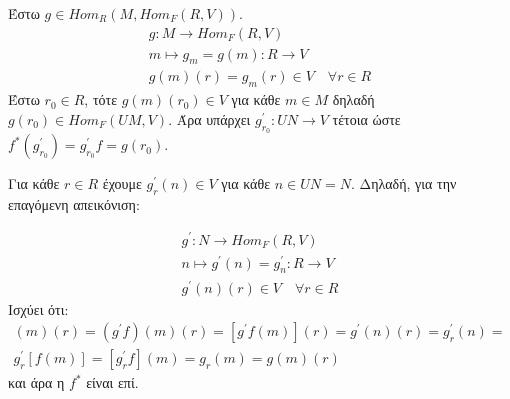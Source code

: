 \documentclass{article}
\begin{document}
\begin{enumerate}
	Έστω $g \in Hom_R (M, Hom_F (R,V))$.
	\begin{gather*}
		g: M \rightarrow Hom_F (R,V)\\
		m \mapsto g_m = g(m) : R \rightarrow V \\
		g(m)(r) = g_m (r) \in V \quad\forall r \in R
	\end{gather*}
	Έστω $r_0 \in R$, τότε $g(m)(r_0) \in V$ για κάθε $m \in M$ δηλαδή $g(r_0 ) \in Hom_F(UM, V)$. Άρα υπάρχει $g^{\prime}_{r_0} : UN \rightarrow V$ τέτοια ώστε $f^* (g^{\prime}_{r_0} ) = g^{\prime}_{r_0}f = g(r_0)$.

	Για κάθε $r \in R$ έχουμε $g^{\prime}_r (n) \in V$ για κάθε $n \in UN = N$. Δηλαδή, για την επαγόμενη απεικόνιση:

	\begin{gather*}
		g^{\prime} : N \rightarrow Hom_F (R,V) \\
		n \mapsto g^{\prime} (n) = g^{\prime}_n : R \rightarrow V \\
		g^{\prime}(n)(r) \in V \quad\forall r \in R
	\end{gather*}
	Ισχύει ότι:
	\begin{gather*}
		[f^* (g^{\prime}) ] (m)(r) = (g^{\prime} f)(m)(r) = [g^{\prime}f(m)](r) = g^{\prime} (n)(r) = g^{\prime}_r (n) = \\
		g^{\prime}_r [f(m)] = [g^{\prime}_r f](m)=g_r (m) = g(m)(r)
	\end{gather*}
	και άρα η $f^*$ είναι επί.
\end{enumerate}
\end{document}
